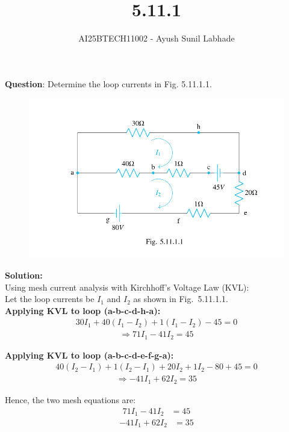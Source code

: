 \documentclass{beamer}
\numberwithin{equation}{section}
\begin{document}
\title{5.11.1}
\author{AI25BTECH11002 - Ayush Sunil Labhade}
{\let\newpage\relax\maketitle}


\textbf{Question}: Determine the loop currents in Fig. 5.11.1.1.
\begin{figure}[H]
    \centering
    \includegraphics[width=\columnwidth]{5.11.1.1.png}
    \label{Circuit}
\end{figure}

\newpage
\textbf{Solution:}\\

Using mesh current analysis with Kirchhoff's Voltage Law (KVL):\\

Let the loop currents be $I_1$ and $I_2$ as shown in Fig.~5.11.1.1.\\

\textbf{Applying KVL to loop (a-b-c-d-h-a):}
\begin{align}
30I_1 + 40(I_1 - I_2) + 1(I_1 - I_2) - 45 = 0
\end{align}
\begin{align}
\Rightarrow 71I_1 - 41I_2 = 45
\end{align}

\textbf{Applying KVL to loop (a-b-c-d-e-f-g-a):}
\begin{align}
40(I_2 - I_1) + 1(I_2 - I_1) + 20I_2 + 1I_2 - 80 + 45 = 0
\end{align}
\begin{align}
\Rightarrow -41I_1 + 62I_2 = 35
\end{align}

Hence, the two mesh equations are:
\begin{align}
	71I_1 - 41I_2 &= 45
\end{align}
\begin{align}
	-41I_1 + 62I_2 &= 35
\end{align}
\end{document}
